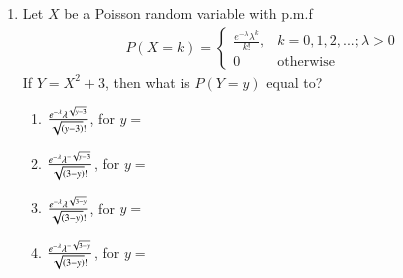 \renewcommand{\theequation}{\theenumi}
\renewcommand{\thefigure}{\theenumi}
\renewcommand{\thetable}{\theenumi}
\begin{enumerate}[label=\thesection.\arabic*.,ref=\thesection.\theenumi]

\item Let $X$ be a Poisson random variable with p.m.f
\begin{align}
\label{poisson/1/eq:1}
P(X=k) = 
    \begin{cases} 
      \frac{e^{-\lambda}\lambda^{k}}{k!},& k=0,1,2,...;  \lambda > 0\\
      0 & \text{otherwise}
   \end{cases}
\end{align}
If $Y = X^2 + 3$, then what is $P(Y=y)$ equal to?
\begin{enumerate}[label={(\Alph*)}]
    \item $\frac{e^{-\lambda}\lambda^{\sqrt{y-3}}}{\sqrt{\left(y-3\right)}!}$, for $y =$ 
    \item $\frac{e^{-\lambda}\lambda^{-\sqrt{y-3}}}{\sqrt{\left(3-y\right)}!}$, for $y =$ 
    \item $\frac{e^{-\lambda}\lambda^{\sqrt{3-y}}}{\sqrt{\left(3-y\right)}!}$, for $y =$ 
    \item $\frac{e^{-\lambda}\lambda^{-\sqrt{3-y}}}{\sqrt{\left(3-y\right)}!}$, for $y =$ 
\end{enumerate}
%
\solution




\end{enumerate}